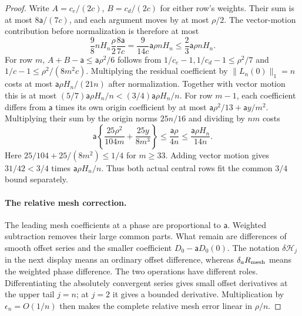 \begin{proof}
Write $A=c_e/(2c)$, $B=c_d/(2c)$ for either row's weights.
Their sum is at most $8\mathsf{a}/(7c)$, and each argument moves by at most
$\rho/2$. The vector-motion contribution before normalization is
therefore at most
\[
 \frac98nH_n\frac\rho2\frac{8\mathsf{a}}{7c}
 =\frac9{14c}\mathsf{a}\rho nH_n\leq\frac23\mathsf{a}\rho nH_n.
\]
For row $m$, $A+B-\mathsf{a}\leq \mathsf{a}\rho^2/6$ follows from
$1/c_e-1,1/c_d-1\leq\rho^2/7$ and
$1/c-1\leq\rho^2/(8m^2c)$. Multiplying the residual coefficient
by $\|L_n(0)\|_1=n$ costs at most $\mathsf{a}\rho H_n/(21n)$ after
normalization. Together with vector motion this is at most
$(5/7)\mathsf{a}\rho H_n/n<(3/4)\mathsf{a}\rho H_n/n$.
For row $m-1$, each coefficient differs from $\mathsf{a}$ times its own origin
coefficient by at most $\mathsf{a}\rho^2/13+\mathsf{a}y/m^2$. Multiplying their sum
by the origin norms $25n/16$ and dividing by $nm$ costs
\[
 \mathsf{a}\left\{\frac{25\rho^2}{104m}+\frac{25y}{8m^3}\right\}
 \leq\frac{\mathsf{a}\rho}{4n}\leq\frac{\mathsf{a}\rho H_n}{14n}.
\]
Here $25/104+25/(8m^2)\leq1/4$ for $m\geq33$.
Adding vector motion gives $31/42<3/4$ times $\mathsf{a}\rho H_n/n$.
Thus both actual central rows fit the common $3/4$ bound separately.

\paragraph{The relative mesh correction.}
The leading mesh coefficients at a phase are proportional to $\mathsf{a}$.
Weighted subtraction removes their large common parts. What remain
are differences of smooth offset series and the smaller coefficient
$D_0-\mathsf{a}D_0(0)$. The notation $\delta\mathcal H_j$ in the next display
means an ordinary offset difference, whereas $\delta_aR_{\rm mesh}$
means the weighted phase difference. The two operations have different
roles. Differentiating the absolutely convergent series gives small
offset derivatives at the upper tail $j=n$; at $j=2$ it gives a
bounded derivative. Multiplication by $\epsilon_n=O(1/n)$ then
makes the complete relative mesh error linear in $\rho/n$.


\end{proof}
